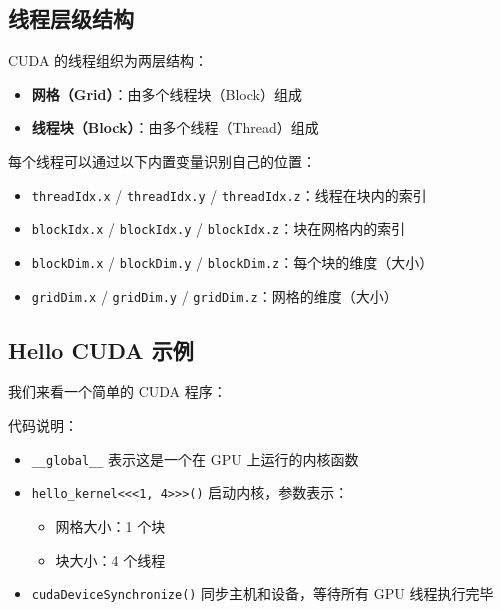 
\subsection{线程层级结构}

CUDA 的线程组织为两层结构：
\begin{itemize}
    \item \textbf{网格（Grid）}：由多个线程块（Block）组成
    \item \textbf{线程块（Block）}：由多个线程（Thread）组成
\end{itemize}

每个线程可以通过以下内置变量识别自己的位置：
\begin{itemize}
    \item \texttt{threadIdx.x} / \texttt{threadIdx.y} / \texttt{threadIdx.z}：线程在块内的索引
    \item \texttt{blockIdx.x} / \texttt{blockIdx.y} / \texttt{blockIdx.z}：块在网格内的索引
    \item \texttt{blockDim.x} / \texttt{blockDim.y} / \texttt{blockDim.z}：每个块的维度（大小）
    \item \texttt{gridDim.x} / \texttt{gridDim.y} / \texttt{gridDim.z}：网格的维度（大小）
\end{itemize}

\subsection{Hello CUDA 示例}

我们来看一个简单的 CUDA 程序：



代码说明：
\begin{itemize}
    \item \texttt{\_\_global\_\_} 表示这是一个在 GPU 上运行的内核函数
    \item \texttt{hello\_kernel<<<1, 4>>>()} 启动内核，参数表示：
        \begin{itemize}
            \item 网格大小：1 个块
            \item 块大小：4 个线程
        \end{itemize}
    \item \texttt{cudaDeviceSynchronize()} 同步主机和设备，等待所有 GPU 线程执行完毕
\end{itemize}

